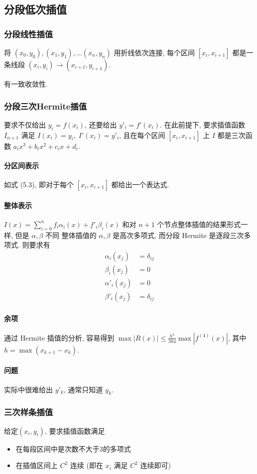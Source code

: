 \documentclass{ctexart}
\begin{document}
\subsection{分段低次插值}
\subsubsection{分段线性插值}
    将 $(x_0,y_0), (x_1,y_1),\ldots (x_n,y_n)$ 用折线依次连接,
    每个区间 $[x_i,x_{i+1}]$ 都是一条线段
    $(x_i,y_i) \to (x_{i+1},y_{i+1})$.\par
    有一致收敛性.
\subsubsection{分段三次Hermite插值}
    要求不仅给出 $y_i = f(x_i)$, 还要给出 $y'_i = f'(x_i)$.
    在此前提下, 要求插值函数 $I_{n+1}$ 满足
    $I(x_i) = y_i,\;I'(x_i) = y'_i$,
    且在每个区间 $[x_i,x_{i+1}]$ 上 $I$
    都是三次函数 $a_ix^3+b_ix^2+c_ix+d_i$.
\paragraph{分区间表示}
    如式 (5.3), 即对于每个 $[x_i,x_{i+1}]$ 都给出一个表达式.
\paragraph{整体表示}
    $I(x) = \sum_{i=0}^n f_i\alpha_i(x) + f'_i\beta_i(x)$
    和对 $n+1$ 个节点整体插值的结果形式一样,
    但是 $\alpha, \beta$ 不同
    整体插值的 $\alpha, \beta$ 是高次多项式, 而分段 Hermite 是逐段三次多项式. 则要求有 \begin{align*}
        \alpha_i(x_j) &= \delta_{ij}\\
        \beta_i(x_j) &= 0\\
        \alpha'_i(x_j) &= 0\\
        \beta'_i(x_j) &= \delta_{ij}
    \end{align*}
\paragraph{余项}
    通过 Hermite 插值的分析, 容易得到
    $\max |R(x)| \le \frac{h^4}{384} \max |f^{(4)}(x)|$, 其中
    $h = \max (x_{k+1} - x_k)$.
\paragraph{问题}
    实际中很难给出 $y'_k$, 通常只知道 $y_k$.
\subsubsection{三次样条插值}
    给定$(x_i,y_i)$, 要求插值函数满足\begin{itemize}
        \item 在每段区间中是次数不大于3的多项式
        \item 在插值区间上 $C^2$ 连续 (即在 $x_i$ 满足 $C^2$ 连续即可)
    \end{itemize}
\end{document}

